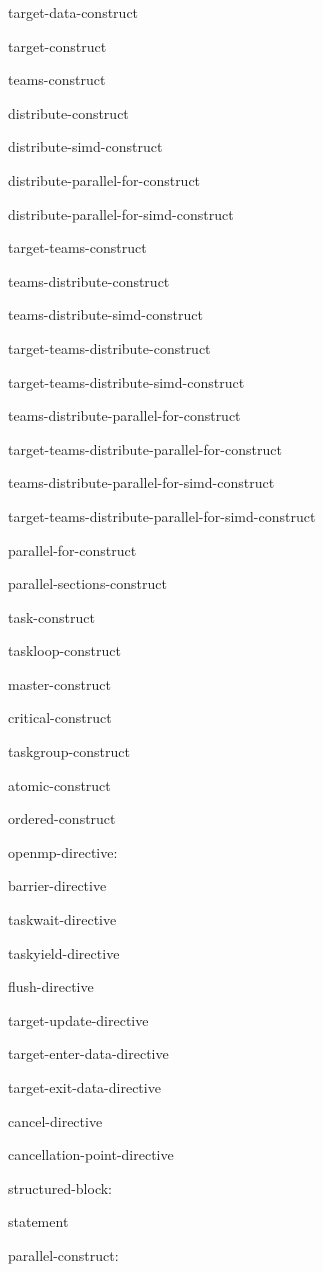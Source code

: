 {\I target-data-construct

\I target-construct

\I teams-construct

\I distribute-construct

\I distribute-simd-construct

\I distribute-parallel-for-construct

\I distribute-parallel-for-simd-construct

\I target-teams-construct

\I teams-distribute-construct

\I teams-distribute-simd-construct

\I target-teams-distribute-construct

\I target-teams-distribute-simd-construct

\I teams-distribute-parallel-for-construct

\I target-teams-distribute-parallel-for-construct

\I teams-distribute-parallel-for-simd-construct

\I target-teams-distribute-parallel-for-simd-construct

\I parallel-for-construct

\I parallel-sections-construct

\I task-construct

\I taskloop-construct

\I master-construct

\I critical-construct

\I taskgroup-construct

\I atomic-construct

\I ordered-construct

openmp-directive:

\I barrier-directive

\I taskwait-directive

\I taskyield-directive

\I flush-directive

\I target-update-directive

\I target-enter-data-directive

\I target-exit-data-directive

\I cancel-directive

\I cancellation-point-directive

structured-block:

\I statement

parallel-construct:

}
